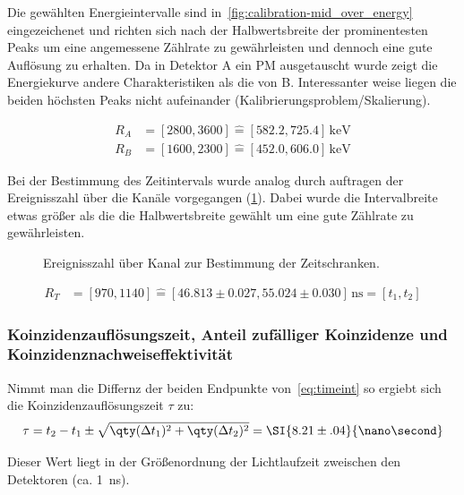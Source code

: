 \documentclass[slug=PET, room=Andreas-Schubert-Bau\,\ 424A, supervisor=Carsten\ Bittrich, coursedate=10.\ 01.\ 2020]{../../Lab_Report_LaTeX/lab_report}
\begin{document}
Die gew\"ahlten Energieintervalle sind
in~\ref{fig:calibration-mid_over_energy} eingezeichenet und richten
sich nach der Halbwertsbreite der prominentesten Peaks um eine
angemessene Z\"ahlrate zu gew\"ahrleisten und dennoch eine gute
Auflösung zu erhalten. Da in Detektor A ein PM ausgetauscht wurde
zeigt die Energiekurve andere Charakteristiken als die von
B. Interessanter weise liegen die beiden h\"ochsten Peaks nicht
aufeinander (Kalibrierungsproblem/Skalierung).

\begin{align}
  \label{eq:fenster}
  R_A &= [2800, 3600] \hat{=} [582.2, 725.4]\,\si{\kilo\electronvolt}
  \\
  R_B &= [1600, 2300] \hat{=} [452.0, 606.0]\,\si{\kilo\electronvolt}
\end{align}

Bei der Bestimmung des Zeitintervals wurde analog durch auftragen der
Ereignisszahl \"uber die Kan\"ale vorgegangen
(\ref{fig:calibration-time_range}). Dabei wurde die Intervalbreite
etwas gr\"o\ss{}er als die die Halbwertsbreite gew\"ahlt um eine gute
Z\"ahlrate zu gew\"ahrleisten.

\begin{figure}[h]\centering
  
  \caption{Ereignisszahl \"uber Kanal zur Bestimmung der Zeitschranken.}
  \label{fig:calibration-time_range}
\end{figure}

\begin{align}
  \label{eq:timeint}
  R_T &= [970, 1140] \hat{=} [46.813\pm 0.027, 55.024\pm
        0.030]\,\si{\nano\second} = [t_1, t_2]
\end{align}

\subsubsection{Koinzidenzaufl\"osungszeit, Anteil zuf\"alliger
  Koinzidenze und Koinzidenznachweiseffektivit\"at}
\label{sec:koaufl}

Nimmt man die Differnz der beiden Endpunkte von~\eqref{eq:timeint} so
ergiebt sich die Koinzidenzaufl\"osungszeit \(\tau\) zu:
\begin{equation}
  \label{eq:koauf}
  \tau = t_2 - t_1 \pm \sqrt{\qty(\Delta t_1)^2 + \qty(\Delta t_2)^2}
  = \SI{8.21\pm .04}{\nano\second}
\end{equation}

Dieser Wert liegt in der Gr\"o\ss{}enordnung der Lichtlaufzeit
zweischen den Detektoren (ca. \SI{1}{\nano\second}).
\end{document}
